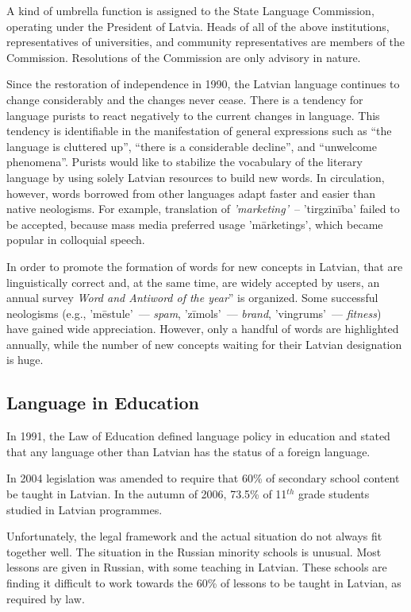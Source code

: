 \begin{multicols}{2}
A kind of umbrella function is assigned to the State Language Commission, operating under the President of Latvia.
Heads of all of the above institutions, representatives of universities, and community representatives are members of the Commission.
Resolutions of the Commission are only advisory in nature.

Since the restoration of independence in 1990, the Latvian language continues to change considerably and the changes never cease.
There is a tendency for language purists to react negatively to the current changes in language.
This tendency is identifiable in the manifestation of general expressions such as ``the language is cluttered up'', ``there is a considerable decline'', and ``unwelcome phenomena''.
Purists would like to stabilize the vocabulary of the literary language by using solely Latvian resources to build new words.
In circulation, however, words borrowed from other languages adapt faster and easier than native neologisms.
For example, translation of \textit{'marketing'}~-- 'tirgzinība' failed to be accepted, because mass media preferred usage 'mārketings', which became popular in colloquial speech.

In order to promote the formation of words for new concepts in Latvian, that are linguistically correct and, at the same time, are widely accepted by users, an annual survey \textit{Word and Antiword of the year}'' is organized.
Some successful neologisms (e.g., 'mēstule'~--- \textit{spam}, 'zīmols'~--- \textit{brand}, 'vingrums'~--- \textit{fitness}) have gained wide appreciation.
However, only a handful of words are highlighted annually, while the number of new concepts waiting for their Latvian designation is huge.

\subsection{Language in Education}
In 1991, the Law of Education defined language policy in education and stated that any language other than Latvian has the status of a foreign language.

In 2004 legislation was amended to require that 60\% of secondary school content be taught in Latvian.
In the autumn of 2006, 73.5\% of 11${}^{th}$ grade students studied in Latvian programmes.

Unfortunately, the legal framework and the actual situation do not always fit together well.
The situation in the Russian minority schools is unusual.
Most lessons are given in Russian, with some teaching in Latvian.
These schools are finding it difficult to work towards the 60\% of lessons to be taught in Latvian, as required by law.


\end{multicols}
